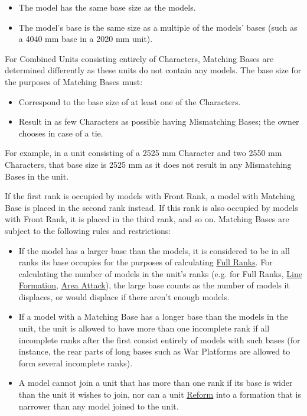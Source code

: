 \begin{itemize}
	\item The model has the same base size as the \rnf{} models.
	\item The model's base is the same size as a multiple of the \rnf{} models' bases (such as a \num{40}\timess{}\num{40} \si{\milli\meter} base in a \num{20}\timess{}\num{20} \si{\milli\meter} unit).
\end{itemize}

For Combined Units consisting entirely of Characters, Matching Bases are determined differently as these units do not contain any \rnf{} models. The \rnf{} base size for the purposes of Matching Bases must:
\begin{itemize}
	\item Correspond to the base size of at least one of the Characters.
	\item Result in as few Characters as possible having Mismatching Bases; the owner chooses in case of a tie.
\end{itemize}

For example, in a unit consisting of a 25\timess{}25 \si{\milli\meter} Character and two 25\timess{}50 \si{\milli\meter} Characters, that base size is 25\timess{}25 \si{\milli\meter} as it does not result in any Mismatching Bases in the unit.

If the first rank is occupied by models with Front Rank, a model with Matching Base is placed in the second rank instead. If this rank is also occupied by models with Front Rank, it is placed in the third rank, and so on. Matching Bases are subject to the following rules and restrictions:
\begin{itemize}
	\item If the model has a larger base than the \rnf{} models, it is considered to be in all ranks its base occupies for the purposes of calculating \hyperref[full_ranks]{Full Ranks}. For calculating the number of models in the unit's ranks (e.g. for Full Ranks, \hyperref[line_formation]{Line Formation}, \hyperref[area_attack]{Area Attack}), the large base counts as the number of models it displaces, or would displace if there aren't enough models.
	\item If a model with a Matching Base has a longer base than the \rnf{} models in the unit, the unit is allowed to have more than one incomplete rank if all incomplete ranks after the first consist entirely of models with such bases (for instance, the rear parts of long bases such as War Platforms are allowed to form several incomplete ranks).
	\item A model cannot join a unit that has more than one rank if its base is wider than the unit it wishes to join, nor can a unit \hyperref[reform]{Reform} into a formation that is narrower than any model joined to the unit.
\end{itemize}

